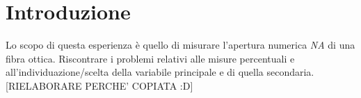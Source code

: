 \section{Introduzione}

Lo scopo di questa esperienza è quello di misurare l'apertura numerica \emph{NA} di una fibra ottica.
Riscontrare i problemi relativi alle misure percentuali e all'individuazione/scelta della variabile principale e di quella secondaria. [RIELABORARE PERCHE' COPIATA :D]
